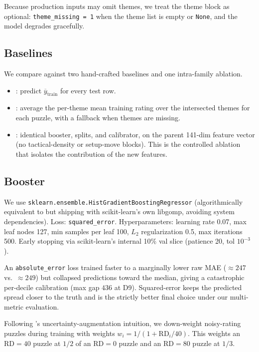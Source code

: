 Because production inputs may omit themes, we treat the theme block as optional: \texttt{theme\_missing = 1} when the theme list is empty or \texttt{None}, and the model degrades gracefully.

\subsection{Baselines}
\label{sec:baselines}
We compare against two hand-crafted baselines and one intra-family ablation.

\begin{itemize}[leftmargin=*,itemsep=0pt,topsep=0pt]
    \item \globalmean: predict $\overline{y}_{\text{train}}$ for every test row.
    \item \thememean: average the per-theme mean training rating over the intersected themes for each puzzle, with a \globalmean fallback when themes are missing.
    \item \parentmodel: identical booster, splits, and calibrator, on the parent 141-dim feature vector (no tactical-density or setup-move blocks). This is the controlled ablation that isolates the contribution of the new features.
\end{itemize}

\subsection{Booster}
\label{sec:booster}
We use \texttt{sklearn.ensemble.HistGradientBoostingRegressor} (algorithmically equivalent to \lightgbm but shipping with scikit-learn's own libgomp, avoiding system dependencies). Loss: \texttt{squared\_error}. Hyperparameters: learning rate 0.07, max leaf nodes 127, min samples per leaf 100, $L_2$ regularization 0.5, max iterations 500. Early stopping via scikit-learn's internal 10\% val slice (patience 20, tol $10^{-3}$).

An \texttt{absolute\_error} loss trained faster to a marginally lower raw MAE ($\approx 247$ vs.\ $\approx 249$) but collapsed predictions toward the median, giving a catastrophic per-decile calibration (max gap $436$ at D9). Squared-error keeps the predicted spread closer to the truth and is the strictly better final choice under our multi-metric evaluation.

Following \glickformer's uncertainty-augmentation intuition, we down-weight noisy-rating puzzles during training with weights $w_i = 1/(1 + \text{RD}_i/40)$. This weights an $\text{RD} = 40$ puzzle at $1/2$ of an $\text{RD} = 0$ puzzle and an $\text{RD} = 80$ puzzle at $1/3$.

